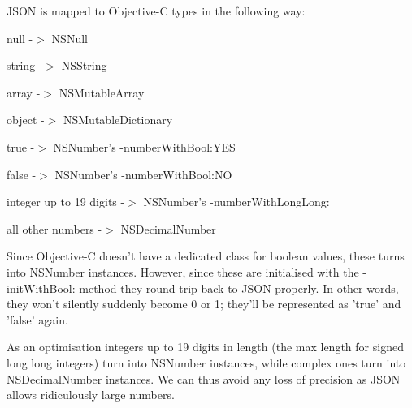 J\-S\-O\-N is mapped to Objective-\/\-C types in the following way\-:

\begin{DoxyItemize}
\item null -\/$>$ N\-S\-Null \item string -\/$>$ N\-S\-String \item array -\/$>$ N\-S\-Mutable\-Array \item object -\/$>$ N\-S\-Mutable\-Dictionary \item true -\/$>$ N\-S\-Number's -\/number\-With\-Bool\-:Y\-E\-S \item false -\/$>$ N\-S\-Number's -\/number\-With\-Bool\-:N\-O \item integer up to 19 digits -\/$>$ N\-S\-Number's -\/number\-With\-Long\-Long\-: \item all other numbers -\/$>$ N\-S\-Decimal\-Number\end{DoxyItemize}
Since Objective-\/\-C doesn't have a dedicated class for boolean values, these turns into N\-S\-Number instances. However, since these are initialised with the -\/init\-With\-Bool\-: method they round-\/trip back to J\-S\-O\-N properly. In other words, they won't silently suddenly become 0 or 1; they'll be represented as 'true' and 'false' again.

As an optimisation integers up to 19 digits in length (the max length for signed long long integers) turn into N\-S\-Number instances, while complex ones turn into N\-S\-Decimal\-Number instances. We can thus avoid any loss of precision as J\-S\-O\-N allows ridiculously large numbers. 